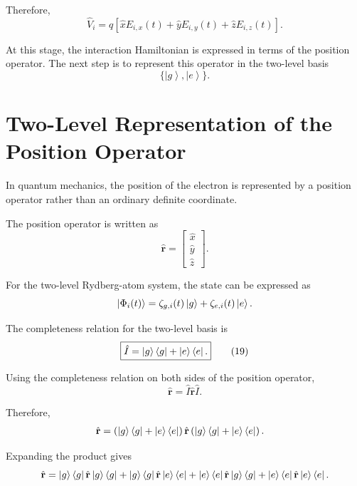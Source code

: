 \documentclass[12pt,a4paper]{article}
\newcommand{\ketg}{\left|g\right\rangle}
\newcommand{\kete}{\left|e\right\rangle}
\begin{document}
Therefore,
\[
\boxed{
\hat V_i
=
q
\left[
\hat xE_{i,x}(t)
+
\hat yE_{i,y}(t)
+
\hat zE_{i,z}(t)
\right].
}
\tag{18}
\]

At this stage, the interaction Hamiltonian is expressed in terms
of the position operator. The next step is to represent this
operator in the two-level basis
\[
\{\ketg,\kete\}.
\]



%


\section{Two-Level Representation of the Position Operator}

In quantum mechanics, the position of the electron is represented by
a position operator rather than an ordinary definite coordinate.

The position operator is written as
\[
\hat{\mathbf r}
=
\begin{bmatrix}
\hat x\\
\hat y\\
\hat z
\end{bmatrix}.
\]

For the two-level Rydberg-atom system, the state can be expressed as
\[
\ket{\Phi_i(t)}
=
\zeta_{g,i}(t)\ketg
+
\zeta_{e,i}(t)\kete.
\]

The completeness relation for the two-level basis is
\begin{equation}
\boxed{
\hat I
=
\ketg\bra g
+
\kete\bra e.
}
\tag{19}
\end{equation}

Using the completeness relation on both sides of the position
operator,
\[
\hat{\mathbf r}
=
\hat I\hat{\mathbf r}\hat I.
\]

Therefore,
\[
\begin{aligned}
\hat{\mathbf r}
&=
\left(
\ketg\bra g+\kete\bra e
\right)
\hat{\mathbf r}
\left(
\ketg\bra g+\kete\bra e
\right).
\end{aligned}
\]

Expanding the product gives
\[
\hat{\mathbf r}
=
\ketg\bra g
\hat{\mathbf r}
\ketg\bra g
+
\ketg\bra g
\hat{\mathbf r}
\kete\bra e
+
\kete\bra e
\hat{\mathbf r}
\ketg\bra g
+
\kete\bra e
\hat{\mathbf r}
\kete\bra e.
\]
\end{document}
